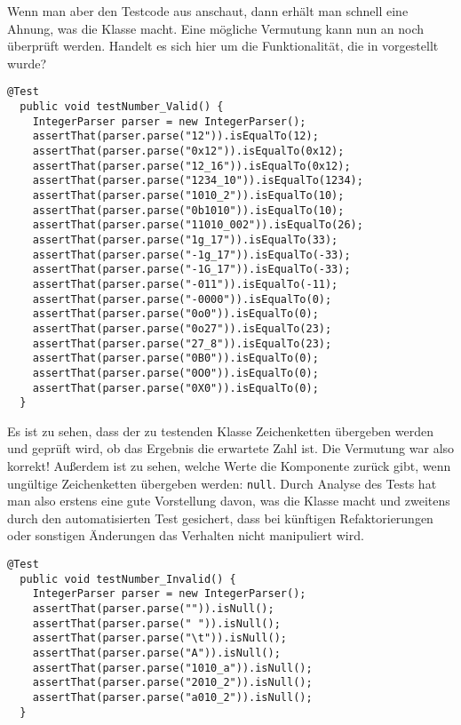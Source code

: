 Wenn man aber den Testcode aus  anschaut, dann erhält man schnell eine Ahnung, was die Klasse macht. Eine mögliche Vermutung kann nun an  noch überprüft werden. Handelt es sich hier um die Funktionalität, die in  vorgestellt wurde?

\begin{lstlisting}[caption={\klasse{IntegerParser} -- Test auf Validität},label=\lstlbl{integerparser-test1}]
  @Test
  public void testNumber_Valid() {
    IntegerParser parser = new IntegerParser();
    assertThat(parser.parse("12")).isEqualTo(12);
    assertThat(parser.parse("0x12")).isEqualTo(0x12);
    assertThat(parser.parse("12_16")).isEqualTo(0x12);
    assertThat(parser.parse("1234_10")).isEqualTo(1234);
    assertThat(parser.parse("1010_2")).isEqualTo(10);
    assertThat(parser.parse("0b1010")).isEqualTo(10);
    assertThat(parser.parse("11010_002")).isEqualTo(26);
    assertThat(parser.parse("1g_17")).isEqualTo(33);
    assertThat(parser.parse("-1g_17")).isEqualTo(-33);
    assertThat(parser.parse("-1G_17")).isEqualTo(-33);
    assertThat(parser.parse("-011")).isEqualTo(-11);
    assertThat(parser.parse("-0000")).isEqualTo(0);
    assertThat(parser.parse("0o0")).isEqualTo(0);
    assertThat(parser.parse("0o27")).isEqualTo(23);
    assertThat(parser.parse("27_8")).isEqualTo(23);
    assertThat(parser.parse("0B0")).isEqualTo(0);
    assertThat(parser.parse("0O0")).isEqualTo(0);
    assertThat(parser.parse("0X0")).isEqualTo(0);
  }
\end{lstlisting}

Es ist zu sehen, dass der zu testenden Klasse Zeichenketten übergeben werden und geprüft wird, ob das Ergebnis die erwartete Zahl ist. Die Vermutung war also korrekt! Außerdem ist zu sehen, welche Werte die Komponente zurück gibt, wenn ungültige Zeichenketten übergeben werden: \texttt{null}. Durch Analyse des Tests hat man also erstens eine gute Vorstellung davon, was die Klasse macht und zweitens durch den automatisierten Test gesichert, dass bei künftigen Refaktorierungen oder sonstigen Änderungen das Verhalten nicht manipuliert wird.

\begin{lstlisting}[caption={\klasse{IntegerParser} -- Test auf Invalidität},label=\lstlbl{integerparser-test2}]
  @Test
  public void testNumber_Invalid() {
    IntegerParser parser = new IntegerParser();
    assertThat(parser.parse("")).isNull();
    assertThat(parser.parse(" ")).isNull();
    assertThat(parser.parse("\t")).isNull();
    assertThat(parser.parse("A")).isNull();
    assertThat(parser.parse("1010_a")).isNull();
    assertThat(parser.parse("2010_2")).isNull();
    assertThat(parser.parse("a010_2")).isNull();
  }
\end{lstlisting}


